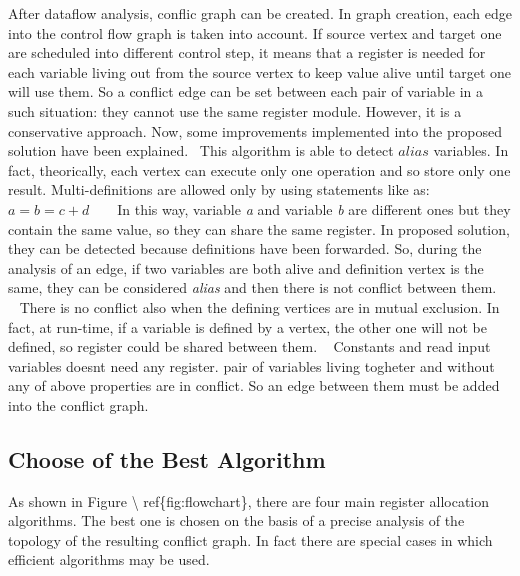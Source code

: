 After dataflow analysis, conflic graph can be created. In graph creation, each edge into the control flow graph is taken into account. If source vertex and target one are scheduled into different control step, it means that a register is needed for each variable living out from the source vertex to keep value alive until target one will use them. So a conflict edge can be set between each pair of variable in a such situation\+: they cannot use the same register module. However, it is a conservative approach. Now, some improvements implemented into the proposed solution have been explained.~\newline
 This algorithm is able to detect $ alias $ variables. In fact, theorically, each vertex can execute only one operation and so store only one result. Multi-\/definitions are allowed only by using statements like as\+: ~\newline
~\newline
 $ a = b = c + d $ ~\newline
~\newline
 In this way, variable {\itshape a} and variable {\itshape b} are different ones but they contain the same value, so they can share the same register. In proposed solution, they can be detected because definitions have been forwarded. So, during the analysis of an edge, if two variables are both alive and definition vertex is the same, they can be considered {\itshape alias} and then there is not conflict between them. ~\newline
~\newline
 There is no conflict also when the defining vertices are in mutual exclusion. In fact, at run-\/time, if a variable is defined by a vertex, the other one will not be defined, so register could be shared between them. ~\newline
 Constants and read input variables doesn\textquotesingle{}t need any register.  pair of variables living togheter and without any of above properties are in conflict. So an edge between them must be added into the conflict graph.\hypertarget{src_HLS_registerAllocation_page_bestalg}{}\subsection{Choose of the Best Algorithm}\label{src_HLS_registerAllocation_page_bestalg}
As shown in Figure \textbackslash{} ref\{fig\+:flowchart\}, there are four main register allocation algorithms. The best one is chosen on the basis of a precise analysis of the topology of the resulting conflict graph. In fact there are special cases in which efficient algorithms may be used.~\newline
